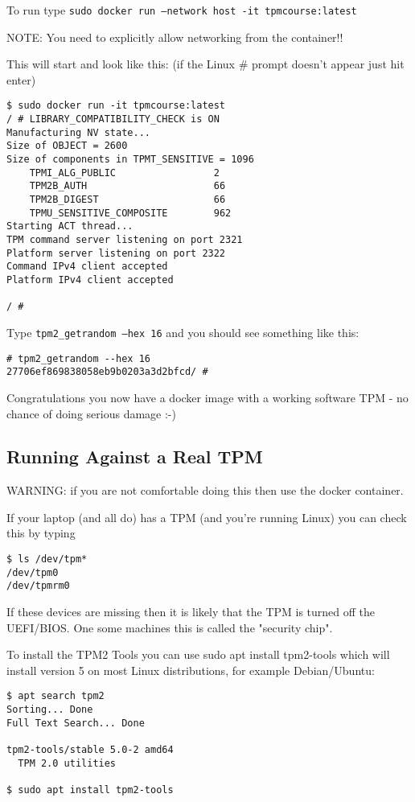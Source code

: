 \documentclass[10pt,a4paper]{article}
\begin{document}
To run type \texttt{sudo docker run --network host -it tpmcourse:latest}

NOTE: You need to explicitly allow networking from the container!!

This will start and look like this: (if the Linux \# prompt doesn't appear just hit enter)

\begin{verbatim}
$ sudo docker run -it tpmcourse:latest
/ # LIBRARY_COMPATIBILITY_CHECK is ON
Manufacturing NV state...
Size of OBJECT = 2600
Size of components in TPMT_SENSITIVE = 1096
    TPMI_ALG_PUBLIC                 2
    TPM2B_AUTH                      66
    TPM2B_DIGEST                    66
    TPMU_SENSITIVE_COMPOSITE        962
Starting ACT thread...
TPM command server listening on port 2321
Platform server listening on port 2322
Command IPv4 client accepted
Platform IPv4 client accepted

/ # 
\end{verbatim}

Type \texttt{tpm2\_getrandom --hex 16} and you should see something like this:

\begin{verbatim}
# tpm2_getrandom --hex 16
27706ef869838058eb9b0203a3d2bfcd/ # 
\end{verbatim}

Congratulations  you now have a docker image with a working software TPM - no chance of doing serious damage :-)

\subsection{Running Against a Real TPM}

WARNING: if you are not comfortable doing this then use the docker container.

If your laptop (and all do) has a TPM (and you're running Linux) you can check this by typing

\begin{verbatim}
$ ls /dev/tpm*
/dev/tpm0
/dev/tpmrm0
\end{verbatim}


If these devices are missing then it is likely that the TPM is turned off the UEFI/BIOS. One some machines this is called the "security chip".

To install the TPM2 Tools you can use sudo apt install tpm2-tools which will install version 5 on most Linux distributions, for example Debian/Ubuntu:

\begin{verbatim}
$ apt search tpm2
Sorting... Done
Full Text Search... Done

tpm2-tools/stable 5.0-2 amd64
  TPM 2.0 utilities

$ sudo apt install tpm2-tools
\end{verbatim}
\end{document}
